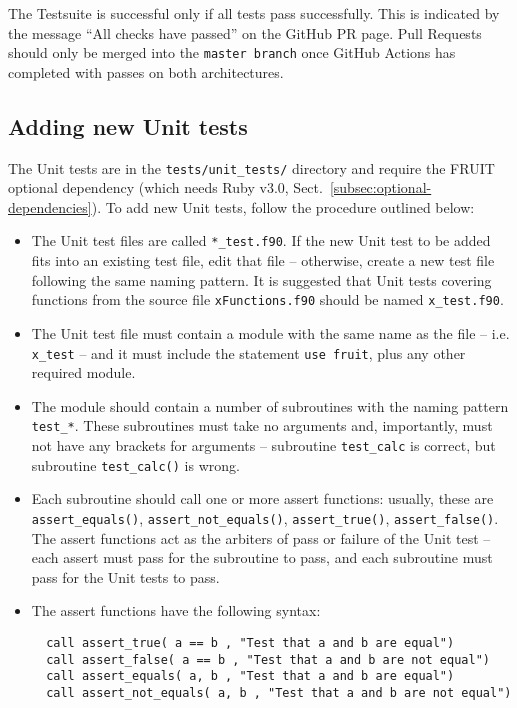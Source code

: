 The Testsuite is successful only if all tests pass successfully. This is
indicated by the message ``All checks have passed'' on the GitHub PR page.
Pull Requests should only be merged into the \texttt{master\ branch}
once GitHub Actions has completed with passes on both architectures.

\subsection{Adding new Unit tests} \label{subsec:adding-new-unit-tests}

The Unit tests are in the \texttt{tests/unit\_tests/} directory and
require the FRUIT optional dependency (which needs Ruby v3.0,
Sect.~\ref{subsec:optional-dependencies}). To add new Unit tests,
follow the procedure outlined below:

\begin{itemize}
\item The Unit test files are called \texttt{*\_test.f90}. If the new
  Unit test to be added fits into an existing test file, edit that
  file -- otherwise, create a new test file following the same naming
  pattern. It is suggested that Unit tests covering functions from the
  source file \texttt{xFunctions.f90} should be named
  \texttt{x\_test.f90}.
\item The Unit test file must contain a module with the same name as
  the file -- i.e. \texttt{x\_test} -- and it must include the
  statement \verb|use fruit|, plus any other required module.
\item The module should contain a number of subroutines with the
  naming pattern \texttt{test\_*}. These subroutines must take no
  arguments and, importantly, must not have any brackets for arguments
  -- subroutine \texttt{test\_calc} is correct, but subroutine
  \texttt{test\_calc()} is wrong.
\item Each subroutine should call one or more assert functions:
  usually, these are \texttt{assert\_equals()}, \texttt{assert\_not\_equals()},
  \texttt{assert\_true()}, \texttt{assert\_false()}. The assert functions
  act as the arbiters of pass or failure of the Unit test -- each
  assert must pass for the subroutine to pass, and each subroutine
  must pass for the Unit tests to pass.
\item The assert functions have the following syntax:
  \begin{verbatim}
  call assert_true( a == b , "Test that a and b are equal")
  call assert_false( a == b , "Test that a and b are not equal")
  call assert_equals( a, b , "Test that a and b are equal")
  call assert_not_equals( a, b , "Test that a and b are not equal")
  \end{verbatim}
\end{itemize}

